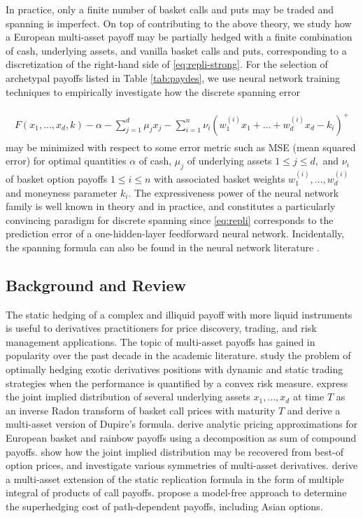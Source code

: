 \documentclass[11pt,A4,twoside]{article}
\numberwithin{equation}{section}
\newcommand{\beqa}{\begin{eqnarray}}
\newcommand{\eeqa}{\end{eqnarray}}
\def\bal{\begin{aligned}}
\def\eal{\end{aligned}}
\def\bll#1{
\beqa\label{#1}\bal
}\def\lel{\eal\eeqa}
\newcommand{\beql}[1]{\bll{#1}}
\newcommand{\eeql}{\lel}
\theoremstyle{definition}
\theoremstyle{remark}
\def\cdots{\dots}
\def\then{l}\def\then{n}%
\begin{document}
 In practice, only a finite number of basket calls and puts may be traded and spanning is imperfect. On top of contributing to the above theory, we study how a European multi-asset payoff may be partially hedged with a finite combination of cash, underlying assets, and vanilla basket calls and puts, corresponding to a discretization of the right-hand side of \eqref{eq:repli-strong}. For the selection of archetypal payoffs listed in Table \ref{tab:paydes},
we use neural network training techniques to empirically investigate how the discrete spanning error
\beql{eq:repli}
    F(x_1, \cdots, x_d, k) - \alpha - \sum_{j = 1}^d\mu_j x_j - \sum_{i=1}^{\then} \nu_i \left(w_1^{(i)} x_1 + \cdots + w_d^{(i)} x_d - k_i\right)^+   
\eeql
may be minimized with respect to some error metric such as MSE (mean squared error) for optimal quantities $\alpha$ of cash, $\mu_j$ 
of underlying assets $1\leq j\leq d,$ and $\nu_i$ of basket option payoffs $1\leq i\leq \then $ with associated basket weights $w_1^{(i)}, \cdots, w_d^{(i)}$ and moneyness parameter $k_i $.
The expressiveness power of the neural network family is well known in theory and in practice, and constitutes a particularly convincing paradigm for discrete spanning since \eqref{eq:repli} corresponds to the prediction error of a one-hidden-layer feedforward neural network.
Incidentally, the \citeauthor{carr-madan:1998} spanning formula can also be found in the neural network literature \citep*[see][Eqns\ (15)--(17)]{savarese2019infinite}.

 \FloatBarrier
\subsection{Background and Review}
 
The static hedging of a complex and illiquid payoff with more liquid instruments is  useful to derivatives practitioners for price discovery, trading, and risk management applications.  The topic of multi-asset payoffs has gained in popularity over the past decade in the academic literature. \citet*{ilhan-jonsson-sircar:2009} study the problem of optimally hedging exotic derivatives positions with dynamic and static trading strategies when the performance is quantified by a convex risk measure.   \citet*{carr-laurence} express the joint implied distribution of several underlying assets $x_1,\cdots, x_d$ at time $T$ as an inverse Radon transform of basket call prices with maturity $T$ and derive a multi-asset version of Dupire's formula. \citet*{alexander-venkatramanan:2012} derive analytic pricing approximations for European basket and rainbow payoffs using a decomposition as sum of compound payoffs. \citet*{Molchanov2014} show how the joint implied distribution may be recovered from best-of option prices, and investigate various symmetries of multi-asset derivatives. \citet*{cui-xu:2022} derive a multi-asset extension of the \citet*{carr-madan:1998} static replication formula in the form of multiple integral of products of call payoffs.  \citet*{chiu-cont:2023} propose a model-free approach to determine the superhedging cost of path-dependent payoffs, including Asian options.
\end{document}
